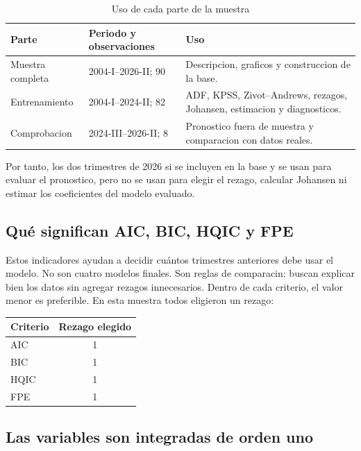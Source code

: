 \documentclass[12pt,a4paper]{article}
\begin{document}
\begin{table}[H]
\centering
\caption{Uso de cada parte de la muestra}
\begin{tabular}{p{}p{}p{}}
\toprule
Parte & Periodo y observaciones & Uso \\
\midrule
Muestra completa & 2004-I--2026-II; 90 & Descripcion, graficos y construccion de la base. \\
Entrenamiento & 2004-I--2024-II; 82 & ADF, KPSS, Zivot--Andrews, rezagos, Johansen, estimacion y diagnosticos. \\
Comprobacion & 2024-III--2026-II; 8 & Pronostico fuera de muestra y comparacion con datos reales. \\
\bottomrule
\end{tabular}
\end{table}

Por tanto, los dos trimestres de 2026 si se incluyen en la base y se usan
para evaluar el pronostico, pero no se usan para elegir el rezago, calcular
Johansen ni estimar los coeficientes del modelo evaluado.



\subsection{Qué significan AIC, BIC, HQIC y FPE}

Estos indicadores ayudan a decidir cuántos trimestres anteriores debe usar el
modelo. No son cuatro modelos finales. Son reglas de comparacin: buscan
explicar bien los datos sin agregar rezagos innecesarios. Dentro de cada
criterio, el valor menor es preferible. En esta muestra todos eligieron un
rezago:

\begin{center}
\begin{tabular}{lc}
\toprule
Criterio & Rezago elegido \\
\midrule
AIC & 1 \\
BIC & 1 \\
HQIC & 1 \\
FPE & 1 \\
\bottomrule
\end{tabular}
\end{center}

\subsection{Las variables son integradas de orden uno}
\end{document}

